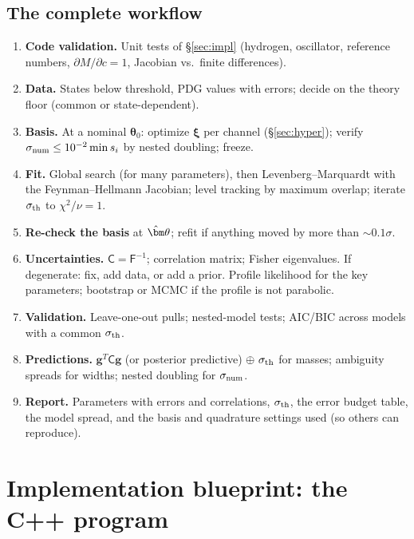\documentclass[11pt,a4paper]{article}
\numberwithin{equation}{section}
\theoremstyle{definition}
\theoremstyle{plain}
\theoremstyle{remark}
\numberwithin{algorithm}{section}
\newcommand{\sF}{\mathsf F}
\newcommand{\sC}{\mathsf C}
\newcommand{\vth}{\bm\theta}
\newcommand{\vg}{\bm g}
\begin{document}
\subsection{The complete workflow}\label{sec:workflow}
\begin{enumerate}[leftmargin=1.5em,itemsep=3pt]
\item \textbf{Code validation.} Unit tests of \S\ref{sec:impl} (hydrogen, oscillator, reference numbers, $\partial M/\partial c=1$, Jacobian vs.\ finite differences).
\item \textbf{Data.} States below threshold, PDG values with errors; decide on the theory floor (common or state-dependent).
\item \textbf{Basis.} At a nominal $\vth_0$: optimize $\bm\xi$ per channel (\S\ref{sec:hyper}); verify $\sigma_{\rm num}\le10^{-2}\min s_i$ by nested doubling; freeze.
\item \textbf{Fit.} Global search (for many parameters), then Levenberg--Marquardt with the Feynman--Hellmann Jacobian; level tracking by maximum overlap; iterate $\sigma_{\rm th}$ to $\chi^2/\nu=1$.
\item \textbf{Re-check the basis} at $\hat\vth$; refit if anything moved by more than $\sim0.1\sigma$.
\item \textbf{Uncertainties.} $\sC=\sF^{-1}$; correlation matrix; Fisher eigenvalues. If degenerate: fix, add data, or add a prior. Profile likelihood for the key parameters; bootstrap or MCMC if the profile is not parabolic.
\item \textbf{Validation.} Leave-one-out pulls; nested-model tests; AIC/BIC across models with a common $\sigma_{\rm th}$.
\item \textbf{Predictions.} $\vg^T\sC\vg$ (or posterior predictive) $\oplus\ \sigma_{\rm th}$ for masses; ambiguity spreads for widths; nested doubling for $\sigma_{\rm num}$.
\item \textbf{Report.} Parameters with errors and correlations, $\sigma_{\rm th}$, the error budget table, the model spread, and the basis and quadrature settings used (so others can reproduce).
\end{enumerate}
\section{Implementation blueprint: the C++ program}\label{sec:blueprint}
\end{document}
